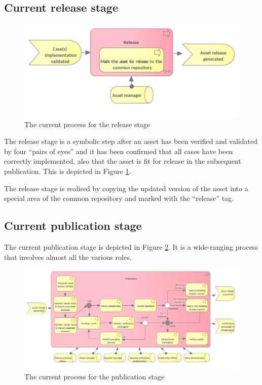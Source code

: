 	\subsection{Current release stage}
	\label{sec:release-current}
	
	\begin{figure}[h]
		\centering
		\includegraphics[width=.6\textwidth]{images/business/current/Release.png}
		\caption{The current process for the release stage}
		\label{fig:release-current}
	\end{figure}

	The release stage is a symbolic step after an asset has been verified and validated by four ``pairs of eyes'' and it has been confirmed that all cases have been correctly implemented, also that the asset is fit for release in the subsequent publication. This is depicted in Figure \ref{fig:release-current}.

	The release stage is realised by copying the updated version of the asset into a special area of the common repository and marked with the ``release'' tag.

	\subsection{Current publication stage}
	
	The current publication stage is depicted in Figure \ref{fig:publication-current}. It is a wide-ranging process that involves almost all the various roles. 
	
	\label{sec:publication-current}
		\begin{figure}[h]
		\centering
		\includegraphics[width=1.03\textwidth]{images/business/current/Publication.png}
		\caption{The current process for the publication stage}
		\label{fig:publication-current}
	\end{figure}

